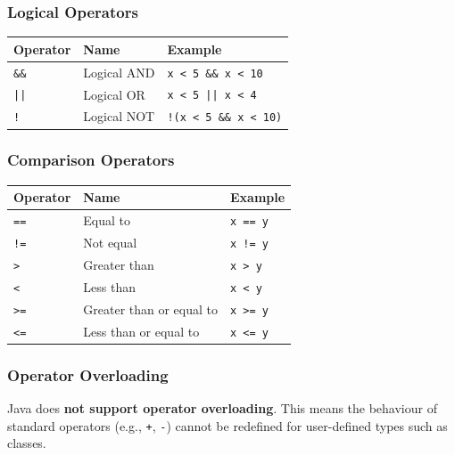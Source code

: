 \documentclass{article}
\begin{document}
\vspace{1em}
\subsubsection{Logical Operators}
\begin{center}
\begin{tabular}{@{}lll@{}}
\toprule
\textbf{Operator} & \textbf{Name} & \textbf{Example} \\
\midrule
\texttt{\&\&} & Logical AND & \texttt{x < 5 \&\& x < 10} \\
\texttt{||}  & Logical OR  & \texttt{x < 5 || x < 4} \\
\texttt{!}   & Logical NOT & \texttt{!(x < 5 \&\& x < 10)} \\
\bottomrule
\end{tabular}
\end{center}

\vspace{1em}
\subsubsection{Comparison Operators}
\begin{center}
\begin{tabular}{@{}lll@{}}
\toprule
\textbf{Operator} & \textbf{Name} & \textbf{Example} \\
\midrule
\texttt{==} & Equal to                 & \texttt{x == y} \\
\texttt{!=} & Not equal                & \texttt{x != y} \\
\texttt{>}  & Greater than             & \texttt{x > y} \\
\texttt{<}  & Less than                & \texttt{x < y} \\
\texttt{>=} & Greater than or equal to & \texttt{x >= y} \\
\texttt{<=} & Less than or equal to    & \texttt{x <= y} \\
\bottomrule
\end{tabular}
\end{center}

\subsubsection{Operator Overloading}

Java does \textbf{not support operator overloading}. This means the behaviour of standard operators (e.g., \texttt{+}, \texttt{-}) cannot be redefined for user-defined types such as classes.
\end{document}
